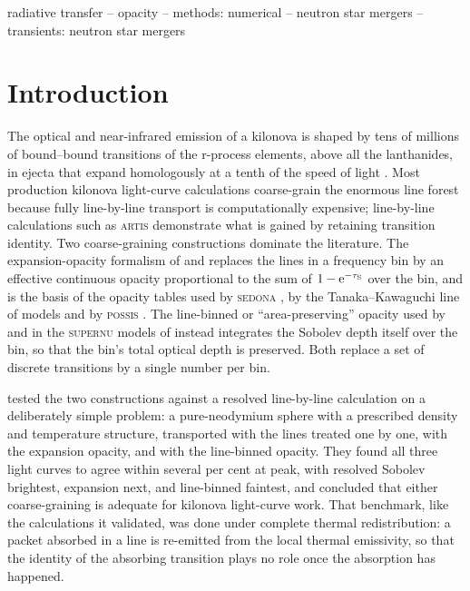 \documentclass[fleqn,usenatbib]{mnras}
\newcommand{\tauS}{\tau_{\rm S}}
\begin{document}
\begin{keywords}
radiative transfer -- opacity -- methods: numerical -- neutron star mergers -- transients: neutron star mergers
\end{keywords}

\section{Introduction}\label{sec:intro}

The optical and near-infrared emission of a kilonova is shaped by tens of millions of bound--bound transitions of the r-process elements, above all the lanthanides, in ejecta that expand homologously at a tenth of the speed of light \citep{kasenbadnell2013,barneskasen2013,tanaka2020,metzger2020}. Most production kilonova light-curve calculations coarse-grain the enormous line forest because fully line-by-line transport is computationally expensive; line-by-line calculations such as \textsc{artis} \citep{shingles2023} demonstrate what is gained by retaining transition identity. Two coarse-graining constructions dominate the literature. The expansion-opacity formalism of \citet{karp1977} and \citet{eastman1993} replaces the lines in a frequency bin by an effective continuous opacity proportional to the sum of $1-{\rm e}^{-\tauS}$ over the bin, and is the basis of the opacity tables used by \textsc{sedona} \citep{sedona,kasen2017}, by the Tanaka--Kawaguchi line of models \citep{tanaka2020,kawaguchi2018} and by \textsc{possis} \citep{bulla2019}. The line-binned or ``area-preserving'' opacity used by \citet{fontes2020} and in the \textsc{supernu} models of \citet{wollaeger2018} instead integrates the Sobolev depth itself over the bin, so that the bin's total optical depth is preserved. Both replace a set of discrete transitions by a single number per bin.

\citet{fontes2020} tested the two constructions against a resolved line-by-line calculation on a deliberately simple problem: a pure-neodymium sphere with a prescribed density and temperature structure, transported with the lines treated one by one, with the expansion opacity, and with the line-binned opacity. They found all three light curves to agree within several per cent at peak, with resolved Sobolev brightest, expansion next, and line-binned faintest, and concluded that either coarse-graining is adequate for kilonova light-curve work. That benchmark, like the calculations it validated, was done under complete thermal redistribution: a packet absorbed in a line is re-emitted from the local thermal emissivity, so that the identity of the absorbing transition plays no role once the absorption has happened.
\end{document}
